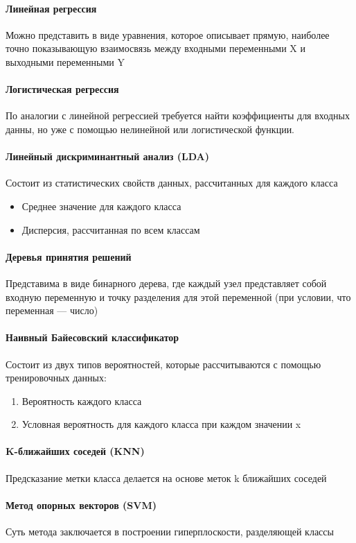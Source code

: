\documentclass[times,specification,annotation]{itmo-student-thesis}
\begin{document}
	\paragraph{Линейная регрессия} Можно представить в виде уравнения, которое описывает прямую, наиболее точно показывающую взаимосвязь между входными переменными X и выходными переменными Y
	\paragraph{Логистическая регрессия} По аналогии с линейной регрессией требуется найти коэффициенты для входных данны, но уже с помощью нелинейной или логистической функции.
	\paragraph{Линейный дискриминантный анализ (LDA)} Состоит из статистических свойств данных, рассчитанных для каждого класса
	\begin{itemize}
		\item Среднее значение для каждого класса
		\item Дисперсия, рассчитанная по всем классам
	\end{itemize}
	\paragraph{Деревья принятия решений}\cite{wan2020nbdt} Представима в виде бинарного дерева, где каждый узел представляет собой входную переменную и точку разделения для этой переменной (при условии, что переменная — число)
	\paragraph{Наивный Байесовский классификатор} Состоит из двух типов вероятностей, которые рассчитываются с помощью тренировочных данных:
	\begin{enumerate} 
		\item Вероятность каждого класса
		\item Условная вероятность для каждого класса при каждом значении x
	\end{enumerate}
	\paragraph{K-ближайших соседей (KNN)} Предсказание метки класса делается на основе меток k ближайших соседей
	\paragraph{Метод опорных векторов (SVM)} Суть метода заключается в построении гиперплоскости, разделяющей классы
\end{document}
